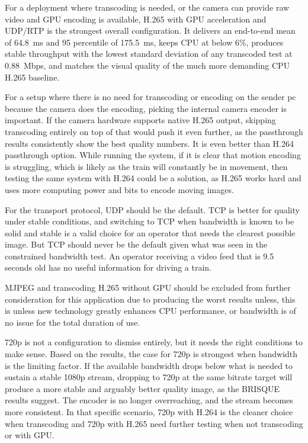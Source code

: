 For a deployment where transcoding is needed, or the camera can provide raw video and GPU encoding is available, H.265 with GPU acceleration and UDP/RTP is the strongest overall configuration. It delivers an end-to-end mean of 64.8~ms and 95 percentile of 175.5~ms, keeps CPU at below 6\%, produces stable throughput with the lowest standard deviation of any transcoded test at 0.88~Mbps, and matches the visual quality of the much more demanding CPU H.265 baseline. 

For a setup where there is no need for transcoding or encoding on the sender pc because the camera does the encoding, picking the internal camera encoder is important. If the camera hardware supports native H.265 output, skipping transcoding entirely on top of that would push it even further, as the passthrough results consistently show the best quality numbers. It is even better than H.264 passthrough option. 
While running the system, if it is clear that motion encoding is struggling, which is likely as the train will constantly be in movement, then testing the same system with H.264 could be a solution, as H.265 works hard and uses more computing power and bits to encode moving images. 

For the transport protocol, UDP should be the default. TCP is better for quality under stable conditions, and switching to TCP when bandwidth is known to be solid and stable is a valid choice for an operator that needs the clearest possible image. But TCP should never be the default given what was seen in the constrained bandwidth test. An operator receiving a video feed that is 9.5 seconds old has no useful information for driving a train.

MJPEG and transcoding H.265 without GPU should be excluded from further consideration for this application due to producing the worst results unless, this is unless new technology greatly enhances CPU performance, or bandwidth is of no issue for the total duration of use.

720p is not a configuration to dismiss entirely, but it needs the right conditions to make sense. Based on the results, the case for 720p is strongest when bandwidth is the limiting factor. If the available bandwidth drops below what is needed to sustain a stable 1080p stream, dropping to 720p at the same bitrate target will produce a more stable and arguably better quality image, as the BRISQUE results suggest. The encoder is no longer overreaching, and the stream becomes more consistent. In that specific scenario, 720p with H.264 is the cleaner choice when transcoding and 720p with H.265 need further testing when not transcoding or with GPU.

